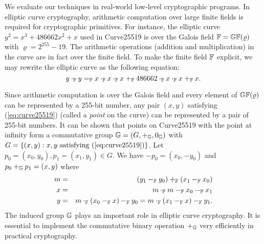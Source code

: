 
We evaluate our techniques in real-world low-level cryptographic
programs. In elliptic curve cryptography, arithmetic computation over
large finite fields is required for cryptographic primitives. For
instance, the elliptic curve $y^2 = x^3 + 486662 x^2 + x$ used in 
Curve25519 is over the Galois field $\mathbb{F} = \mathbb{GF}(\varrho)$ with
$\varrho = 2^{255} - 19$. The arithmetic operations (addition and
multiplication) in the curve are in fact over the finite field. To
make the finite field $\mathbb{F}$ explicit, we may rewrite the elliptic
curve as the following equation: 
\begin{equation}
  \label{eq:curve25519}
  y \cdot_{\mathbb{F}} y =_{\mathbb{F}} x \cdot_{\mathbb{F}} x \cdot_{\mathbb{F}} x +_{\mathbb{F}}
  486662 \cdot_{\mathbb{F}} x \cdot_{\mathbb{F}} x +_{\mathbb{F}} x.
\end{equation}

Since arithmetic computation is over the Galois field and every
element of $\mathbb{GF}(\varrho)$ can be represented by a 255-bit number,
any pair $(x, y)$ satisfying (\ref{eq:curve25519}) (called a
\emph{point} on the curve) can be represented by a pair of 255-bit
numbers. It can be shown that points on Curve25519 with the point at
infinity form a commutative group $\mathbb{G} = (G, +_{\mathbb{G}}, 0_{\mathbb{G}})$
with $G = \{ (x, y) : x, y \textmd{ satisfying } (\ref{eq:curve25519})
\}$. Let $p_0 = (x_0, y_0), p_1 = (x_1, y_1) \in G$. We have $-p_0 =
(x_0, -y_0)$ and $p_0 +_{\mathbb{G}} p_1 = (x, y)$ where
\begin{eqnarray*}
  m & = & (y_1 -_{\mathbb{F}} y_0) \div_{\mathbb{F}} (x_1 -_{\mathbb{F}} x_0)\\
  x & = & m \cdot_{\mathbb{F}} m -_{\mathbb{F}} x_0 -_{\mathbb{F}} x_1\\
  y & = & m \cdot_{\mathbb{F}} (x_0 -_{\mathbb{F}} x) -_{\mathbb{F}} y_0
     = m \cdot_{\mathbb{F}} (x_1 -_{\mathbb{F}} x) -_{\mathbb{F}} y_1.
\end{eqnarray*}
The induced group $\mathbb{G}$ plays an important role in elliptic
curve cryptography. It is essential to implement the commutative binary
operation $+_{\mathbb{G}}$ very efficiently in practical cryptography. 